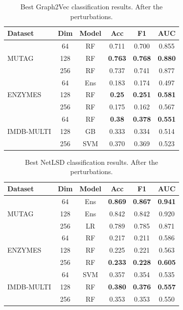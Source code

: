\begin{table}
\centering
\begin{tabular}{l c c c c c}
\hline
\textbf{Dataset} & \textbf{Dim} & \textbf{Model} & \textbf{Acc} & \textbf{F1} & \textbf{AUC} \\
\hline
      & 64  & RF  & 0.711 & 0.700 & 0.855 \\
MUTAG      & 128 & RF  & \textbf{0.763} & \textbf{0.768} & \textbf{0.880} \\
     & 256 & RF  & 0.737 & 0.741 & 0.877 \\
\hline
    & 64  & Ens & 0.183 & 0.174 & 0.497 \\
ENZYMES    & 128 & RF  & \textbf{0.25} & \textbf{0.251} & \textbf{0.581} \\
   & 256 & RF  & 0.175 & 0.162 & 0.567 \\
\hline
 & 64  & RF  & \textbf{0.38} & \textbf{0.378} & \textbf{0.551} \\
IMDB-MULTI & 128 & GB  & 0.333 & 0.334 & 0.514 \\
 & 256 & SVM & 0.370 & 0.369 & 0.523 \\
\hline
\end{tabular}
\caption{Best Graph2Vec classification results. 
After the perturbations.}
\label{tab:graph2vec_best_per}
\end{table}



\begin{table}
\centering
\begin{tabular}{l c c c c c}
\hline
\textbf{Dataset} & \textbf{Dim} & \textbf{Model} & \textbf{Acc} & \textbf{F1} & \textbf{AUC} \\
\hline
     & 64  & Ens & \textbf{0.869} & \textbf{0.867} & \textbf{0.941} \\
MUTAG      & 128 & Ens & 0.842 & 0.842 & 0.920 \\
     & 256 & LR  & 0.789 & 0.785 & 0.871 \\
\hline
   & 64  & RF  & 0.217 & 0.211 & 0.586 \\
ENZYMES    & 128 & RF  & 0.225 & 0.221 & 0.563 \\
    & 256 & RF  & \textbf{0.233} & \textbf{0.228} & \textbf{0.605} \\
\hline
 & 64  & SVM & 0.357 & 0.354 & 0.535 \\
IMDB-MULTI & 128 & RF  & \textbf{0.380} & \textbf{0.376} & \textbf{0.557} \\
 & 256 & RF  & 0.353 & 0.353 & 0.550 \\
\hline
\end{tabular}
\caption{Best NetLSD classification results.
After the perturbations.}
\label{tab:netlsd_best_per}
\end{table}
